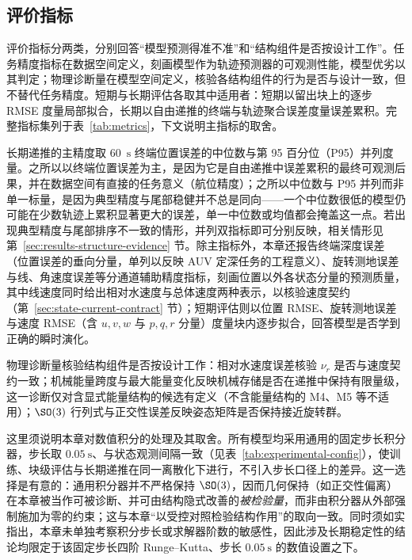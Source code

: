 \subsection{评价指标}
\label{subsec:metrics}

评价指标分两类，分别回答“模型预测得准不准”和“结构组件是否按设计工作”。任务精度指标在数据空间定义，刻画模型作为轨迹预测器的可观测性能，模型优劣以其判定；物理诊断量在模型空间定义，核验各结构组件的行为是否与设计一致，但不替代任务精度。短期与长期评估各取其中适用者：短期以留出块上的逐步 RMSE 度量局部拟合，长期以自由递推的终端与轨迹聚合误差度量误差累积。完整指标集列于表~\ref{tab:metrics}，下文说明主指标的取舍。

长期递推的主精度取 60~\(\mathrm{s}\) 终端位置误差的中位数与第 95 百分位（P95）并列度量。之所以以终端位置误差为主，是因为它是自由递推中误差累积的最终可观测后果，并在数据空间有直接的任务意义（航位精度）；之所以中位数与 P95 并列而非单一标量，是因为典型精度与尾部稳健并不总是同向——一个中位数很低的模型仍可能在少数轨迹上累积显著更大的误差，单一中位数或均值都会掩盖这一点。若出现典型精度与尾部排序不一致的情形，并列双指标即可分别反映，相关情形见第~\ref{sec:results-structure-evidence} 节。除主指标外，本章还报告终端深度误差（位置误差的垂向分量，单列以反映 AUV 定深任务的工程意义）、旋转测地误差与线、角速度误差等分通道辅助精度指标，刻画位置以外各状态分量的预测质量，其中线速度同时给出相对水速度与总体速度两种表示，以核验速度契约（第~\ref{sec:state-current-contract} 节）；短期评估则以位置 RMSE、旋转测地误差与速度 RMSE（含 \(u,v,w\) 与 \(p,q,r\) 分量）度量块内逐步拟合，回答模型是否学到正确的瞬时演化。

物理诊断量核验结构组件是否按设计工作：相对水速度误差核验 \(\nu_r\) 是否与速度契约一致；机械能量跨度与最大能量变化反映机械存储是否在递推中保持有限量级，这一诊断仅对含显式能量结构的候选有定义（不含能量结构的 M4、M5 等不适用）；\(\SO(3)\) 行列式与正交性误差反映姿态矩阵是否保持接近旋转群。

这里须说明本章对数值积分的处理及其取舍。所有模型均采用通用的固定步长积分器，步长取 \(0.05~\mathrm{s}\)、与状态观测间隔一致（见表~\ref{tab:experimental-config}），使训练、块级评估与长期递推在同一离散化下进行，不引入步长口径上的差异。这一选择是有意的：通用积分器并不严格保持 \(\SO(3)\)，因而几何保持（如正交性偏离）在本章被当作可被诊断、并可由结构隐式改善的\emph{被检验量}，而非由积分器从外部强制施加为零的约束；这与本章“以受控对照检验结构作用”的取向一致。同时须如实指出，本章未单独考察积分步长或求解器阶数的敏感性，因此涉及长期稳定性的结论均限定于该固定步长四阶 Runge--Kutta、步长 \(0.05~\mathrm{s}\) 的数值设置之下。

